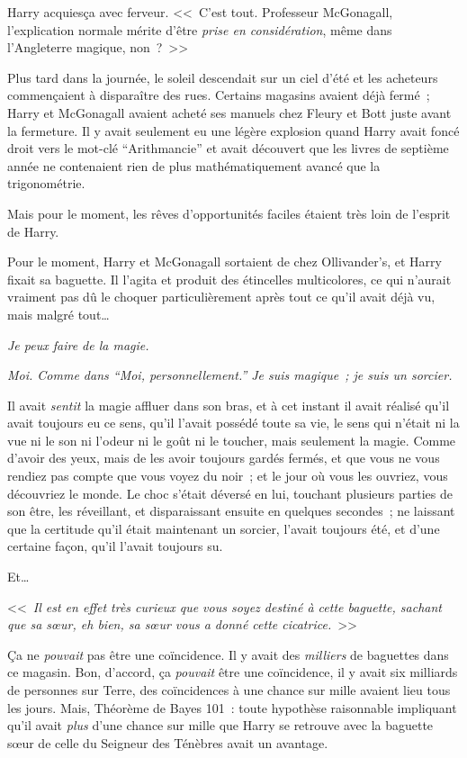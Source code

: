 Harry acquiesça avec ferveur. <<~C'est tout. Professeur McGonagall, l'explication normale mérite d'être \emph{prise en considération}, même dans l'Angleterre magique, non~?~>>

\later

Plus tard dans la journée, le soleil descendait sur un ciel d'été et les acheteurs commençaient à disparaître des rues. Certains magasins avaient déjà fermé~; Harry et McGonagall avaient acheté ses manuels chez Fleury et Bott juste avant la fermeture. Il y avait seulement eu une légère explosion quand Harry avait foncé droit vers le mot-clé “Arithmancie” et avait découvert que les livres de septième année ne contenaient rien de plus mathématiquement avancé que la trigonométrie.

Mais pour le moment, les rêves d'opportunités faciles étaient très loin de l'esprit de Harry.

Pour le moment, Harry et McGonagall sortaient de chez Ollivander's, et Harry fixait sa baguette. Il l'agita et produit des étincelles multicolores, ce qui n'aurait vraiment pas dû le choquer particulièrement après tout ce qu'il avait déjà vu, mais malgré tout…

\emph{Je peux faire de la magie.}

\emph{Moi. Comme dans “Moi, personnellement.” Je suis magique~; je suis un sorcier.}

Il avait \emph{sentit} la magie affluer dans son bras, et à cet instant il avait réalisé qu'il avait toujours eu ce sens, qu'il l'avait possédé toute sa vie, le sens qui n'était ni la vue ni le son ni l'odeur ni le goût ni le toucher, mais seulement la magie. Comme d'avoir des yeux, mais de les avoir toujours gardés fermés, et que vous ne vous rendiez pas compte que vous voyez du noir~; et le jour où vous les ouvriez, vous découvriez le monde. Le choc s'était déversé en lui, touchant plusieurs parties de son être, les réveillant, et disparaissant ensuite en quelques secondes~; ne laissant que la certitude qu'il était maintenant un sorcier, l'avait toujours été, et d'une certaine façon, qu'il l'avait toujours su.

Et…

<<~\emph{Il est en effet très curieux que vous soyez destiné à cette baguette, sachant que sa sœur, eh bien, sa sœur vous a donné cette cicatrice.}~>>

Ça ne \emph{pouvait} pas être une coïncidence. Il y avait des \emph{milliers} de baguettes dans ce magasin. Bon, d'accord, ça \emph{pouvait} être une coïncidence, il y avait six milliards de personnes sur Terre, des coïncidences à une chance sur mille avaient lieu tous les jours. Mais, Théorème de Bayes 101~: toute hypothèse raisonnable impliquant qu'il avait \emph{plus} d'une chance sur mille que Harry se retrouve avec la baguette sœur de celle du Seigneur des Ténèbres avait un avantage.

